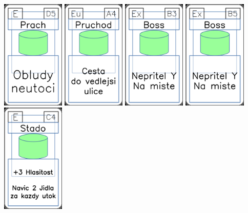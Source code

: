 \documentclass[a4paper]{article}
\begin{document}
	\includegraphics[width=3.0cm]{img-4_49}
	\includegraphics[width=3.0cm]{img-4_33}
	\includegraphics[width=3.0cm]{img-4_7}
	\includegraphics[width=3.0cm]{img-4_9}
	\includegraphics[width=3.0cm]{img-4_43}
\end{document}
